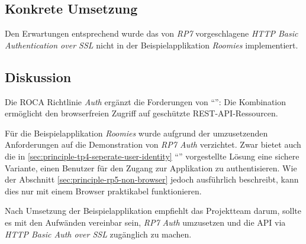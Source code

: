 \subsection*{Konkrete Umsetzung}

Den Erwartungen entsprechend wurde das von \emph{RP7} vorgeschlagene \emph{HTTP Basic Authentication over SSL} nicht in der Beispielapplikation \emph{Roomies} implementiert.


\subsection*{Diskussion}

Die ROCA Richtlinie \emph{Auth} ergänzt die Forderungen von ``'': Die Kombination ermöglicht den browserfreien Zugriff auf geschützte REST-API-Ressourcen.

Für die Beispielapplikation \emph{Roomies} wurde aufgrund der umzusetzenden Anforderungen auf die Demonstration von \emph{RP7 Auth} verzichtet. Zwar bietet auch die in \ref{sec:principle-tp4-seperate-user-identity} ``'' vorgestellte Lösung eine sichere Variante, einen Benutzer für den Zugang zur Applikation zu authentisieren. Wie der Abschnitt \ref{sec:principle-rp5-non-browser} jedoch ausführlich beschreibt, kann dies nur mit einem Browser praktikabel funktionieren.

Nach Umsetzung der Beispielapplikation empfiehlt das Projektteam darum, sollte es mit den Aufwänden vereinbar sein, \emph{RP7 Auth} umzusetzen und die API via \emph{HTTP Basic Auth over SSL} zugänglich zu machen.